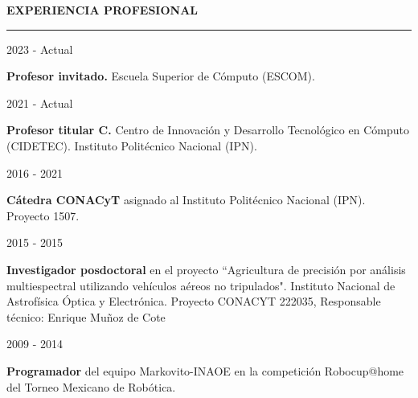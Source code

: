 \documentclass[10pt]{article}
\begin{document}
{\bf EXPERIENCIA PROFESIONAL}
\vspace{3pt}
\hrule

\begin{minipage}{1.5 in}
	2023 - Actual\\
\end{minipage}
\begin{minipage}{4.5in}
	\textbf{Profesor invitado.} Escuela Superior de Cómputo (ESCOM).\\ 
\end{minipage}

\begin{minipage}{1.5 in}
	2021 - Actual\\
\end{minipage}
\begin{minipage}{4.5in}
	\textbf{Profesor titular C.} Centro de Innovación y Desarrollo Tecnológico en Cómputo (CIDETEC). Instituto Politécnico Nacional (IPN).\\ 
\end{minipage}

\begin{minipage}{1.5 in}
	2016 - 2021\\
\end{minipage}
\begin{minipage}{4.5in}
	\textbf{Cátedra CONACyT} asignado al Instituto Politécnico Nacional (IPN). Proyecto 1507.\\ 
\end{minipage}

\begin{minipage}{1.5 in}
	2015 - 2015\\
\end{minipage}
\begin{minipage}{4.5in}
	\textbf{Investigador posdoctoral} en el proyecto ``Agricultura de precisión por análisis multiespectral
	utilizando vehículos aéreos no tripulados". Instituto Nacional de Astrofísica Óptica y Electrónica. Proyecto CONACYT 222035, Responsable técnico: Enrique Muñoz de Cote\\ 
\end{minipage}

\begin{minipage}{1.5 in}
2009 - 2014\\
\end{minipage}
\begin{minipage}{4.5in}
\textbf{Programador} del equipo Markovito-INAOE en la competición Robocup@home del Torneo Mexicano de Robótica.\\ 
\end{minipage}
\end{document}
